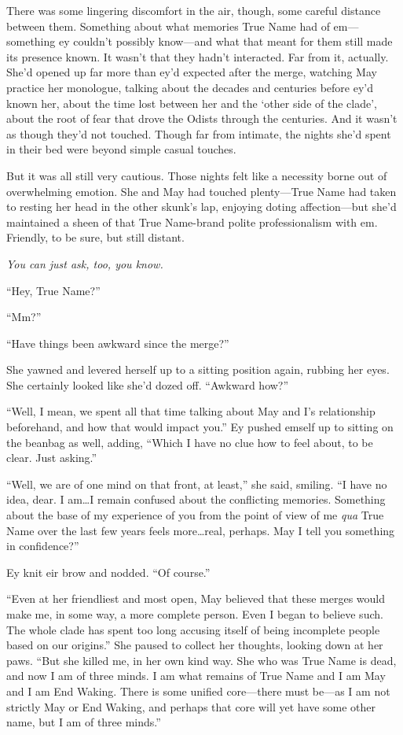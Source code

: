 There was some lingering discomfort in the air, though, some careful distance between them. Something about what memories True Name had of em—something ey couldn't possibly know—and what that meant for them still made its presence known. It wasn't that they hadn't interacted. Far from it, actually. She'd opened up far more than ey'd expected after the merge, watching May practice her monologue, talking about the decades and centuries before ey'd known her, about the time lost between her and the `other side of the clade', about the root of fear that drove the Odists through the centuries. And it wasn't as though they'd not touched. Though far from intimate, the nights she'd spent in their bed were beyond simple casual touches.

But it was all still very cautious. Those nights felt like a necessity borne out of overwhelming emotion. She and May had touched plenty—True Name had taken to resting her head in the other skunk's lap, enjoying doting affection—but she'd maintained a sheen of that True Name-brand polite professionalism with em. Friendly, to be sure, but still distant.

\emph{You can just ask, too, you know.}

``Hey, True Name?''

``Mm?''

``Have things been awkward since the merge?''

She yawned and levered herself up to a sitting position again, rubbing her eyes. She certainly looked like she'd dozed off. ``Awkward how?''

``Well, I mean, we spent all that time talking about May and I's relationship beforehand, and how that would impact you.'' Ey pushed emself up to sitting on the beanbag as well, adding, ``Which I have no clue how to feel about, to be clear. Just asking.''

``Well, we are of one mind on that front, at least,'' she said, smiling. ``I have no idea, dear. I am\ldots I remain confused about the conflicting memories. Something about the base of my experience of you from the point of view of me \emph{qua} True Name over the last few years feels more\ldots real, perhaps. May I tell you something in confidence?''

Ey knit eir brow and nodded. ``Of course.''

``Even at her friendliest and most open, May believed that these merges would make me, in some way, a more complete person. Even I began to believe such. The whole clade has spent too long accusing itself of being incomplete people based on our origins.'' She paused to collect her thoughts, looking down at her paws. ``But she killed me, in her own kind way. She who was True Name is dead, and now I am of three minds. I am what remains of True Name and I am May and I am End Waking. There is some unified core—there must be—as I am not strictly May or End Waking, and perhaps that core will yet have some other name, but I am of three minds.''

